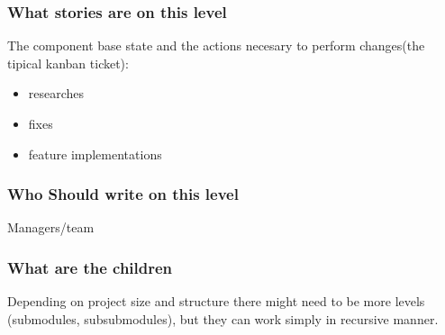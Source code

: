 \subsubsection{What stories are on this level}
The component base state and the actions necesary to perform changes(the tipical kanban ticket):
\begin{itemize}
    \item researches
    \item fixes
    \item feature implementations
\end{itemize} 
\subsubsection{Who Should write on this level}
Managers/team
\subsubsection{What are the children}
Depending on project size and structure there might need to be more levels (submodules, subsubmodules), but they can work simply in recursive manner.

